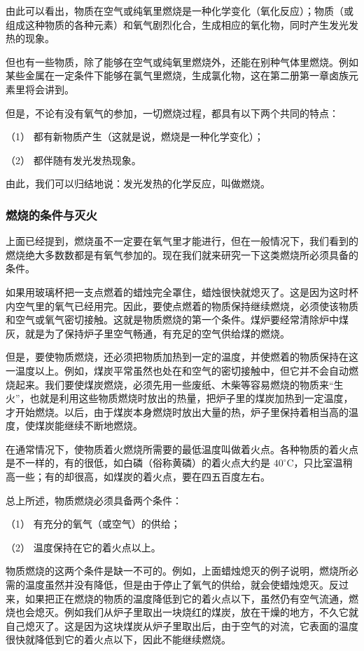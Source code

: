 由此可以看出，物质在空气或纯氧里燃烧是一种化学变化（氧化反应）；物质（或组成这种物质的各种元素）和氧气剧烈化合，生成相应的氧化物，同时产生发光发热的现象。

但也有一些物质，除了能够在空气或纯氧里燃烧外，还能在别种气体里燃烧。例如某些金属在一定条件下能够在氯气里燃烧，生成氯化物，这在第二册第一章卤族元素里将会讲到。

但是，不论有没有氧气的参加，一切燃烧过程，都具有以下两个共同的特点：

（1） 都有新物质产生（这就是说，燃烧是一种化学变化）；

（2） 都伴随有发光发热现象。

由此，我们可以归结地说：发光发热的化学反应，叫做燃烧。

\subsubsection{燃烧的条件与灭火}

上面已经提到，燃烧虽不一定要在氧气里才能进行，但在一般情况下，我们看到的燃烧绝大多数数都是有氧气参加的。现在我们就来研究一下这类燃烧所必须具备的条件。

如果用玻璃杯把一支点燃着的蜡烛完全罩住，蜡烛很快就熄灭了。这是因为这时杯内空气里的氧气已经用完。因此，要使点燃着的物质保持继续燃烧，必须使该物质和空气或氧气密切接触。这就是物质燃烧的第一个条件。煤炉要经常清除炉中煤灰，就是为了保持炉子里空气畅通，有充足的空气供给煤的燃烧。

但是，要使物质燃烧，还必须把物质加热到一定的温度，并使燃着的物质保持在这一温度以上。例如，煤炭平常虽然也处在和空气的密切接触中，但它并不会自动燃烧起来。我们要使煤炭燃烧，必须先用一些废纸、木柴等容易燃烧的物质来``生火''，也就是利用这些物质燃烧时放出的热量，把炉子里的煤炭加热到一定温度，才开始燃烧。以后，由于煤炭本身燃烧时放出大量的热，炉子里保持着相当高的温度，使煤炭能继续不断地燃烧。

在通常情况下，使物质着火燃烧所需要的最低温度叫做着火点。各种物质的着火点是不一样的，有的很低，如白磷（俗称黄磷）的着火点大约是
\(40^{\circ}\mathrm{C}\)，只比室温稍高一些；有的却很高，如煤炭的着火点，要在四五百度左右。

总上所述，物质燃烧必须具备两个条件：

（1） 有充分的氧气（或空气）的供给；

（2） 温度保持在它的着火点以上。

物质燃烧的这两个条件是缺一不可的。例如，上面蜡烛熄灭的例子说明，燃烧所必需的温度虽然并没有降低，但是由于停止了氧气的供给，就会使蜡烛熄灭。反过来，如果把正在燃烧的物质的温度降低到它的着火点以下，虽然仍有空气流通，燃烧也会熄灭。例如我们从炉子里取出一块烧红的煤炭，放在干燥的地方，不久它就自己熄灭了。这是因为这块煤炭从炉子里取出后，由于空气的对流，它表面的温度很快就降低到它的着火点以下，因此不能继续燃烧。

